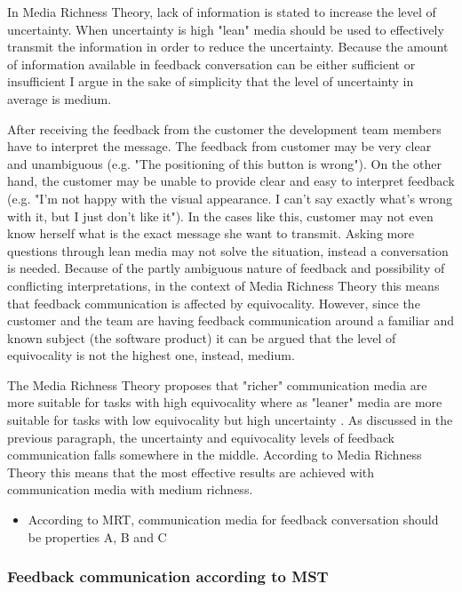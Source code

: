\documentclass[english,12pt,a4paper,pdftex]{article}
\begin{document}
In Media Richness Theory, lack of information is stated to increase the level of uncertainty. When uncertainty is high "lean" media should be used to effectively transmit the information in order to reduce the uncertainty. Because the amount of information available in feedback conversation can be either sufficient or insufficient I argue in the sake of simplicity that the level of uncertainty in average is medium.

After receiving the feedback from the customer the development team members have to interpret the message. The feedback from customer may be very clear and unambiguous (e.g. "The positioning of this button is wrong"). On the other hand, the customer may be unable to provide clear and easy to interpret feedback (e.g. "I'm not happy with the visual appearance. I can't say exactly what's wrong with it, but I just don't like it"). In the cases like this, customer may not even know herself what is the exact message she want to transmit. Asking more questions through lean media may not solve the situation, instead a conversation is needed. Because of the partly ambiguous nature of feedback and possibility of conflicting interpretations, in the context of Media Richness Theory this means that feedback communication is affected by equivocality. However, since the customer and the team are having feedback communication around a familiar and known subject (the software product) it can be argued that the level of equivocality is not the highest one, instead, medium.

The Media Richness Theory proposes that "richer" communication media are more suitable for tasks with high equivocality where as "leaner" media are more suitable for tasks with low equivocality but high uncertainty \citep{daft1986}. As discussed in the previous paragraph, the uncertainty and equivocality levels of feedback communication falls somewhere in the middle. According to Media Richness Theory this means that the most effective results are achieved with communication media with medium richness.

\begin{itemize}
\item According to MRT, communication media for feedback conversation should be properties A, B and C
\end{itemize}

\subsubsection{Feedback communication according to MST}
\end{document}
